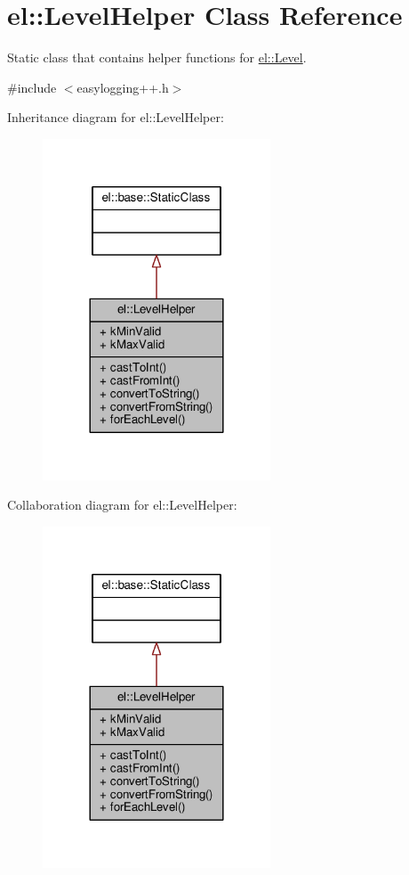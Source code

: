 \hypertarget{classel_1_1LevelHelper}{}\section{el\+:\+:Level\+Helper Class Reference}
\label{classel_1_1LevelHelper}


Static class that contains helper functions for \hyperlink{namespaceel_ab0ac6091262344c52dd2d3ad099e8e36}{el\+::\+Level}.  




{\ttfamily \#include $<$easylogging++.\+h$>$}



Inheritance diagram for el\+:\+:Level\+Helper\+:
\nopagebreak
\begin{figure}[H]
\begin{center}
\leavevmode
\includegraphics[width=192pt]{d0/d14/classel_1_1LevelHelper__inherit__graph}
\end{center}
\end{figure}


Collaboration diagram for el\+:\+:Level\+Helper\+:
\nopagebreak
\begin{figure}[H]
\begin{center}
\leavevmode
\includegraphics[width=192pt]{db/d22/classel_1_1LevelHelper__coll__graph}
\end{center}
\end{figure}
